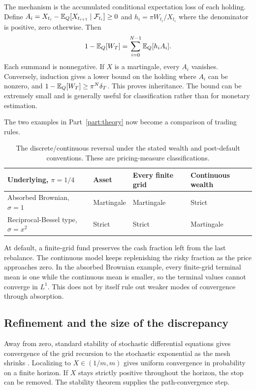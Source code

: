 The mechanism is the accumulated conditional expectation loss of each
holding. Define
$A_i=X_{t_i}-\mathbb{E}_Q[X_{t_{i+1}}\mid\mathcal F_{t_i}]\geq0$ and
$h_i=\pi W_{t_i}/X_{t_i}$ where the denominator is positive, zero
otherwise. Then
\begin{equation}\label{eq:lossdecomp}
 1-\mathbb{E}_Q[W_T]=\sum_{i=0}^{N-1}\mathbb{E}_Q[h_i A_i].
\end{equation}
Each summand is nonnegative. If $X$ is a martingale, every $A_i$ vanishes.
Conversely, induction gives a lower bound on the holding where $A_i$ can
be nonzero, and
$1-\mathbb{E}_Q[W_T]\geq\pi^N\delta_T$. This proves inheritance. The bound
can be extremely small and is generally useful for classification rather
than for monetary estimation.

The two examples in Part~\ref{part:theory} now become a comparison of
trading rules.
\begin{table}[htbp]\centering\small
\begin{tabularx}{\linewidth}{@{}YYYY@{}}\toprule
Underlying, $\pi=1/4$ & Asset & Every finite grid & Continuous wealth\\
\midrule
Absorbed Brownian, $\sigma=1$ & Martingale & Martingale & Strict\\
Reciprocal-Bessel type, $\sigma=x^2$ & Strict & Strict & Martingale\\
\bottomrule\end{tabularx}
\caption{The discrete/continuous reversal under the stated wealth and
post-default conventions. These are pricing-measure classifications.}
\label{tab:reversal}
\end{table}

At default, a finite-grid fund preserves the cash fraction left from the
last rebalance. The continuous model keeps replenishing the risky
fraction as the price approaches zero. In the absorbed Brownian example,
every finite-grid terminal mean is one while the continuous mean is
smaller, so the terminal values cannot converge in $L^1$. This does not
by itself rule out weaker modes of convergence through absorption.

\subsection{Refinement and the size of the discrepancy}
Away from zero, standard stability of stochastic differential equations
gives convergence of the grid recursion to the stochastic exponential as
the mesh shrinks \cite{emery1979lipschitz}. Localizing to
$X\in(1/m,m)$ gives uniform convergence in probability on a finite
horizon. If $X$ stays strictly positive throughout the horizon, the stop
can be removed. The stability theorem supplies the path-convergence step.

